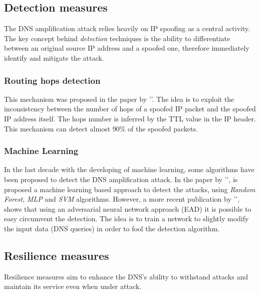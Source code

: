 \subsection*{Detection measures}
The DNS amplification attack relies heavily on IP spoofing as a central activity. The key concept behind \textit{detection} techniques is the ability 
to differentiate between an original source IP address and a spoofed one, therefore immediately identify and mitigate the attack. 

\subsubsection*{Routing hops detection}
This mechanism was proposed in the paper by '\cite{hopcount}'. The idea is to exploit the inconsistency between the
number of hops of a spoofed IP packet and the spoofed IP address itself. The hops number is inferred by the TTL value in the IP header.
This mechanism can detect almost 90\% of the spoofed packets.

\subsubsection*{Machine Learning}
In the last decade with the developing of machine learning, some algorithms have been proposed to detect the DNS amplification attack.
In the paper by '\cite{machinelearning}', is proposed a machine learning based approach to detect the attacks, using 
\textit{Random Forest}, \textit{MLP} and \textit{SVM} algorithms. However, a more recent publication by 
'\cite{createDNS}', shows that using an adversarial neural network approach (EAD) it is possible to easy circumvent the detection. 
The idea is to train a network to slightly modify the input data (DNS queries) in order to fool the detection algorithm.

\subsection*{Resilience measures}
Resilience measures aim to enhance the DNS's ability to withstand attacks and maintain its service even when under attack.

